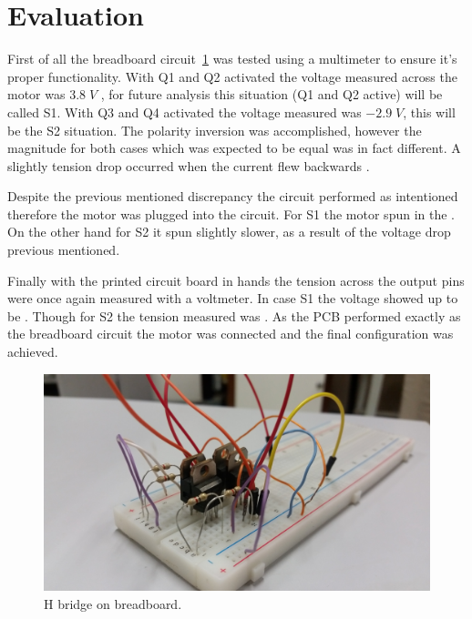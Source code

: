 \section{\textbf{Evaluation}}\label{sec:5}

	First of all the breadboard circuit~\ref{fig:proto_board} was tested using a multimeter to ensure it's proper functionality. With Q1 and Q2 activated the voltage measured across the motor was $3.8\;V$ , for future analysis this situation (Q1 and Q2 active) will be called S1. With Q3 and Q4 activated the voltage measured was $-2.9\;V$, this will be the S2 situation. The polarity inversion was accomplished, however the magnitude for both cases which was expected to be equal was in fact different. A slightly tension drop occurred when the current flew backwards . 
	
	Despite the previous mentioned discrepancy the circuit performed as intentioned therefore the motor was plugged into the circuit. For S1 the motor spun in the . On the other hand for S2 it spun  slightly slower, as a result of the voltage drop previous mentioned.
	
	Finally with the printed circuit board in hands the tension across the output pins were once again measured with a voltmeter. In case S1 the voltage showed up to be . Though for S2 the tension measured was . As the PCB performed exactly as the breadboard circuit the motor was connected and the final configuration was achieved. 

\begin{figure}[t]
\centering
\centering%
\includegraphics[height=.30\textwidth]{img/h_bridge_proto_close.jpg}
\caption{H bridge on breadboard.}
\label{fig:proto_board}%
\end{figure}
